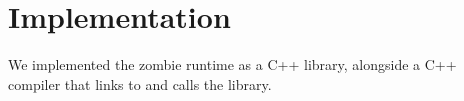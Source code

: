 
\section{Implementation}
We implemented the zombie runtime as a C++ library, alongside a C++ compiler that links to and calls the library.

